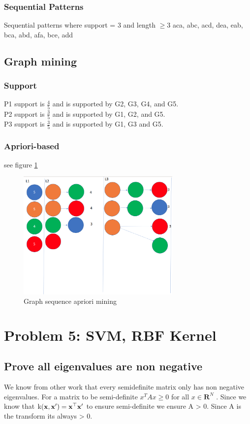 \documentclass[11pt]{article}
\begin{document}
\subsubsection{Sequential Patterns}
Sequential patterns where support = 3 and length $\ge 3$
aca, abc, acd, dea, eab, bca, abd, afa, bce, add
\subsection{Graph mining}
\subsubsection{Support}
P1 support is $\frac{4}{5}$ and is supported by G2, G3, G4, and G5. \\
P2 support is $\frac{3}{5}$ and is supported by G1, G2, and G5. \\
P3 support is $\frac{3}{5}$ and is supported by G1, G3 and G5.
\subsubsection{Apriori-based}
see figure \ref{fig:graph-apri}
\begin{figure}[]
\centering
\includegraphics[width=8cm]{Assignments/Assignment1/graphapri.png}
\caption{Graph sequence apriori mining}
\label{fig:graph-apri}
\end{figure}
\section{Problem 5: SVM, RBF Kernel}
\subsection{Prove all eigenvalues are non negative}
We know from other work that every semidefinite matrix only has non negative eigenvalues. 
For a matrix to be semi-definite $x^TAx \ge 0$ for all $x \in \mathbf{R}^N $ . Since we know that $\text{k}(\bold{x}, \bold{x}') = \bold{x}^\top \bold{x}'$ to ensure semi-definite we ensure A > 0. Since A is the transform its always > 0. 
\end{document}
